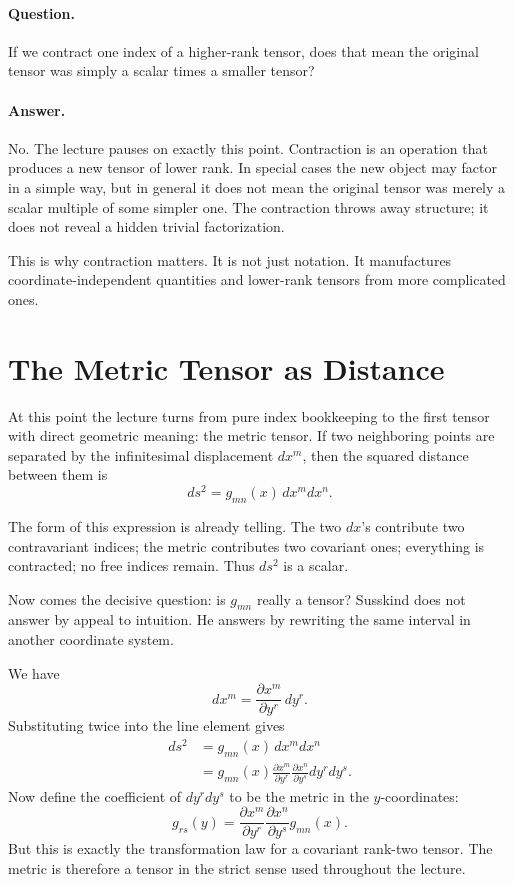 \paragraph{Question.} If we contract one index of a higher-rank tensor, does that mean the original tensor was simply a scalar times a smaller tensor?

\paragraph{Answer.} No. The lecture pauses on exactly this point. Contraction is an operation that produces a new tensor of lower rank. In special cases the new object may factor in a simple way, but in general it does not mean the original tensor was merely a scalar multiple of some simpler one. The contraction throws away structure; it does not reveal a hidden trivial factorization.

This is why contraction matters. It is not just notation. It manufactures coordinate-independent quantities and lower-rank tensors from more complicated ones.

\section{The Metric Tensor as Distance}

At this point the lecture turns from pure index bookkeeping to the first tensor with direct geometric meaning: the metric tensor. If two neighboring points are separated by the infinitesimal displacement \(dx^m\), then the squared distance between them is
\begin{equation}
ds^2=g_{mn}(x)\,dx^m dx^n.
\end{equation}

The form of this expression is already telling. The two \(dx\)'s contribute two contravariant indices; the metric contributes two covariant ones; everything is contracted; no free indices remain. Thus \(ds^2\) is a scalar.

Now comes the decisive question: is \(g_{mn}\) really a tensor? Susskind does not answer by appeal to intuition. He answers by rewriting the same interval in another coordinate system.

We have
\begin{equation}
dx^m=\frac{\partial x^m}{\partial y^r}\,dy^r.
\end{equation}
Substituting twice into the line element gives
\begin{align}
ds^2
&=
g_{mn}(x)\,dx^m dx^n \\
&=
g_{mn}(x)
\frac{\partial x^m}{\partial y^r}
\frac{\partial x^n}{\partial y^s}
dy^r dy^s.
\end{align}
Now define the coefficient of \(dy^r dy^s\) to be the metric in the \(y\)-coordinates:
\begin{equation}
g_{rs}(y)=
\frac{\partial x^m}{\partial y^r}
\frac{\partial x^n}{\partial y^s}
g_{mn}(x).
\end{equation}
But this is exactly the transformation law for a covariant rank-two tensor. The metric is therefore a tensor in the strict sense used throughout the lecture.

